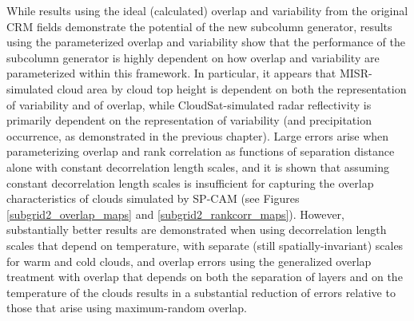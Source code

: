 While results using the ideal (calculated) overlap and variability from the original CRM fields demonstrate the potential of the new subcolumn generator, results using the parameterized overlap and variability show that the performance of the subcolumn generator is highly dependent on how overlap and variability are parameterized within this framework. In particular, it appears that MISR-simulated cloud area by cloud top height is dependent on both the representation of variability and of overlap, while CloudSat-simulated radar reflectivity is primarily dependent on the representation of variability (and precipitation occurrence, as demonstrated in the previous chapter). Large errors arise when parameterizing overlap and rank correlation as functions of separation distance alone with constant decorrelation length scales, and it is shown that assuming constant decorrelation length scales is insufficient for capturing the overlap characteristics of clouds simulated by SP-CAM (see Figures \ref{subgrid2_overlap_maps} and \ref{subgrid2_rankcorr_maps}). However, substantially better results are demonstrated when using decorrelation length scales that depend on temperature, with separate (still spatially-invariant) scales for warm and cold clouds, and overlap errors using the generalized overlap treatment with overlap that depends on both the separation of layers and on the temperature of the clouds results in a substantial reduction of errors relative to those that arise using maximum-random overlap.

